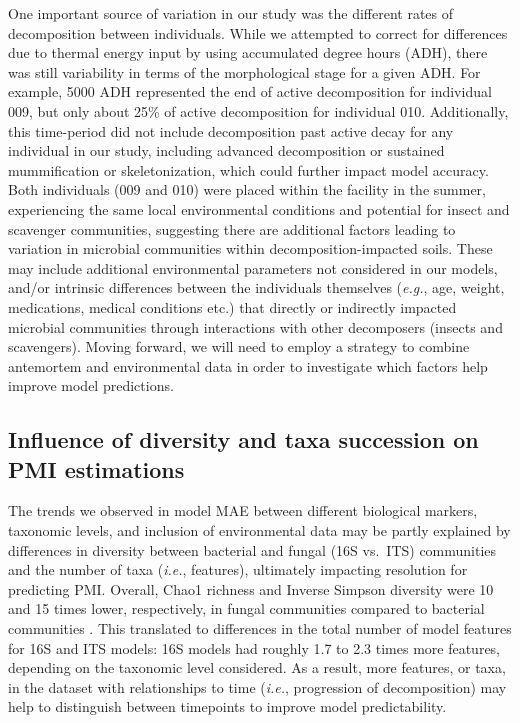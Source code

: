 \documentclass[
  10pt,
  letterpaper,
]{article}
\begin{document}
One important source of variation in our study was the different rates
of decomposition between individuals. While we attempted to correct for
differences due to thermal energy input by using accumulated degree
hours (ADH), there was still variability in terms of the morphological
stage for a given ADH. For example, 5000 ADH represented the end of
active decomposition for individual 009, but only about 25\% of active
decomposition for individual 010. Additionally, this time-period did not
include decomposition past active decay for any individual in our study,
including advanced decomposition or sustained mummification or
skeletonization, which could further impact model accuracy. Both
individuals (009 and 010) were placed within the facility in the summer,
experiencing the same local environmental conditions and potential for
insect and scavenger communities, suggesting there are additional
factors leading to variation in microbial communities within
decomposition-impacted soils. These may include additional environmental
parameters not considered in our models, and/or intrinsic differences
between the individuals themselves (\emph{e.g.}, age, weight,
medications, medical conditions etc.) that directly or indirectly
impacted microbial communities through interactions with other
decomposers (insects and scavengers). Moving forward, we will need to
employ a strategy to combine antemortem and environmental data in order
to investigate which factors help improve model predictions.

\subsection{Influence of diversity and taxa succession on PMI
estimations}\label{influence-of-diversity-and-taxa-succession-on-pmi-estimations}

The trends we observed in model MAE between different biological
markers, taxonomic levels, and inclusion of environmental data may be
partly explained by differences in diversity between bacterial and
fungal (16S vs.~ITS) communities and the number of taxa (\emph{i.e.},
features), ultimately impacting resolution for predicting PMI. Overall,
Chao1 richness and Inverse Simpson diversity were 10 and 15 times lower,
respectively, in fungal communities compared to bacterial communities
\citep{mason_body_2022}. This translated to differences in the total
number of model features for 16S and ITS models: 16S models had roughly
1.7 to 2.3 times more features, depending on the taxonomic level
considered. As a result, more features, or taxa, in the dataset with
relationships to time (\emph{i.e.}, progression of decomposition) may
help to distinguish between timepoints to improve model predictability.
\end{document}
